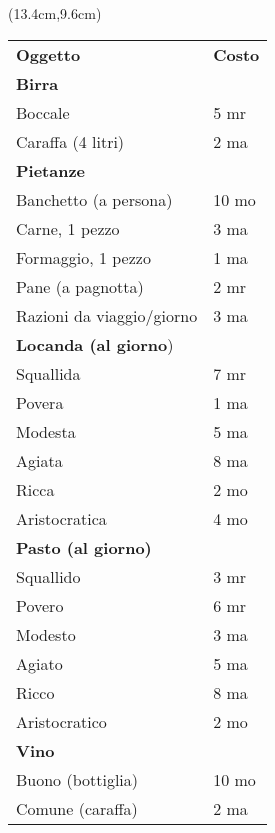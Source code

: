 \documentclass[a4paper,12 pt,openany]{book}
\begin{document}
\begin{textblock*}{6cm}(13.4cm,9.6cm) %

\begin{tabular}{ll}
\textbf{Oggetto}&\textbf{Costo}\\
\textbf{Birra}&\\
Boccale&5 mr\\
Caraffa (4 litri)&2 ma\\
\textbf{Pietanze} &\\
Banchetto (a persona)&10 mo\\
Carne, 1 pezzo&3 ma\\
Formaggio, 1 pezzo&1 ma\\
Pane (a pagnotta)&2 mr\\
Razioni da viaggio/giorno& 3 ma \\
\textbf{Locanda (al giorno})&\\
Squallida&7 mr\\
Povera&1 ma\\
Modesta&5 ma\\
Agiata&8 ma\\
Ricca&2 mo\\
Aristocratica&4 mo\\
\textbf{Pasto (al giorno)}&\\
Squallido&3 mr\\
Povero&6 mr\\
Modesto&3 ma\\
Agiato&5 ma\\
Ricco&8 ma\\
Aristocratico&2 mo\\
\textbf{Vino}&\\
Buono (bottiglia)&10 mo\\
Comune (caraffa)&2 ma\\
\end{tabular}





\end{textblock*}


~\newpage
\end{document}
